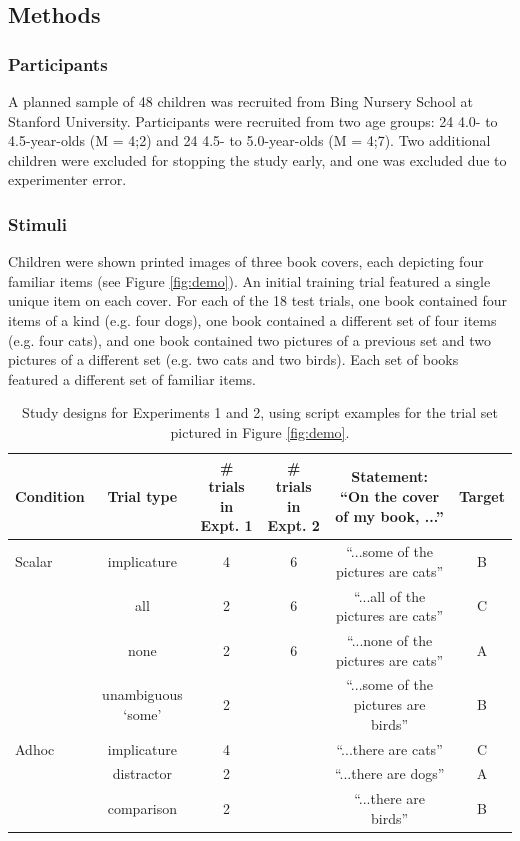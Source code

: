 \documentclass[10pt,letterpaper]{article}
\begin{document}
\subsection{Methods}

\subsubsection{Participants}

A planned sample of 48 children was recruited from Bing Nursery School at Stanford University.  Participants were recruited from two age groups: 24 4.0- to 4.5-year-olds (M = 4;2) and 24 4.5- to 5.0-year-olds (M = 4;7). Two additional children were excluded for stopping the study early, and one was excluded due to experimenter error. 

\subsubsection{Stimuli}

Children were shown printed images of three book covers, each depicting four familiar items (see Figure \ref{fig:demo}). An initial training trial featured a single unique item on each cover. For each of the 18 test trials, one book contained four items of a kind (e.g. four dogs), one book contained a different set of four items (e.g. four cats), and one book contained two pictures of a previous set and two pictures of a different set (e.g. two cats and two birds). Each set of books featured a different set of familiar items. 


 \begin{table} [t]
   \caption{Study designs for Experiments 1 and 2, using script examples for the trial set pictured in Figure \ref{fig:demo}.  \label{tab:scripts} } 
   \begin{center} 
     \begin{tabular}{lccccc} 
                      \hline 
       \null   Condition  & Trial type & \# trials in Expt. 1 & \# trials in Expt. 2 & Statement: ``On the cover of my book, ...'' & Target   \\ 
       \hline  
            Scalar & implicature & 4 & 6 &  ``...some of the pictures are cats'' & B	 \\ 
          & all  & 2 &  6 & ``...all of the pictures are cats'' & C		                 \\
           & none  & 2 & 6 & ``...none of the pictures are cats'' & A			\\ 
               & unambiguous `some' 	&  2 &  & ``...some of the pictures are birds'' & B					        \\ 
	\hline
	    Adhoc       & implicature & 4 &  & ``...there are cats'' & C 		\\ 
	     & distractor & 2 &  & ``...there are dogs'' & A	     \\ 
          & comparison & 2 &  & ``...there are birds'' & B 	   \\
       \hline 
     \end{tabular} 
  \end{center}
 \end{table}
 
\end{document}
